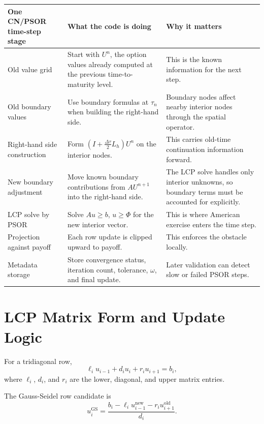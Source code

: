 \documentclass[11pt,a4paper]{article}
\begin{document}
\begin{longtable}{L{0.22\textwidth}L{0.34\textwidth}L{0.32\textwidth}}
\toprule
One CN/PSOR time-step stage & What the code is doing & Why it matters \\
\midrule
\endhead
Old value grid & Start with \(U^n\), the option values already computed at the previous
time-to-maturity level. & This is the known information for the next step. \\
Old boundary values & Use boundary formulas at \(\tau_n\) when building the right-hand side. &
Boundary nodes affect nearby interior nodes through the spatial operator. \\
Right-hand side construction & Form \((I+\frac{\Delta\tau}{2}L_h)U^n\) on the interior nodes. &
This carries old-time continuation information forward. \\
New boundary adjustment & Move known boundary contributions from \(A U^{n+1}\) into the
right-hand side. & The LCP solve handles only interior unknowns, so boundary terms must be
accounted for explicitly. \\
LCP solve by PSOR & Solve \(A u \geq b\), \(u\geq\Phi\) for the new interior vector. & This is
where American exercise enters the time step. \\
Projection against payoff & Each row update is clipped upward to payoff. & This enforces the
obstacle locally. \\
Metadata storage & Store convergence status, iteration count, tolerance, \(\omega\), and final
update. & Later validation can detect slow or failed PSOR steps. \\
\bottomrule
\end{longtable}

\section{LCP Matrix Form and Update Logic}

For a tridiagonal row,
\begin{equation}
  \ell_i u_{i-1} + d_i u_i + r_i u_{i+1} = b_i,
\end{equation}
where \(\ell_i\), \(d_i\), and \(r_i\) are the lower, diagonal, and upper matrix entries.

The Gauss-Seidel row candidate is
\begin{equation}
  u_i^{\mathrm{GS}} =
  \frac{
    b_i - \ell_i u_{i-1}^{\mathrm{new}} - r_i u_{i+1}^{\mathrm{old}}
  }{d_i}.
\end{equation}
\end{document}
